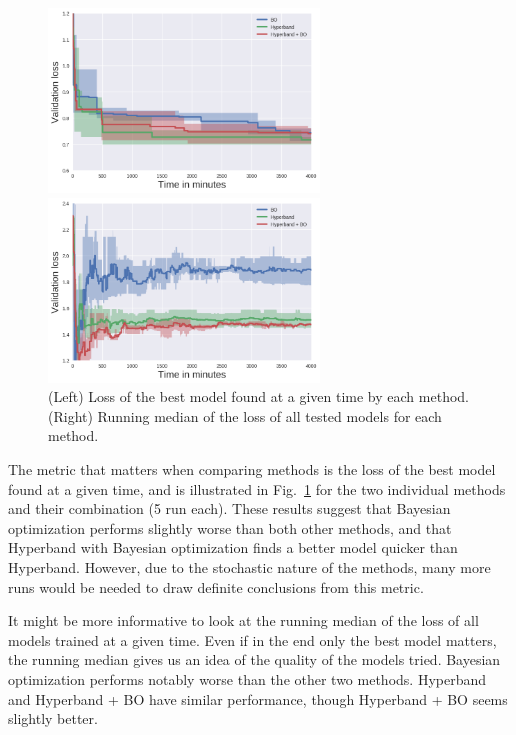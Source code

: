 \begin{figure}[htb]
	\begin{minipage}[b]{.49\linewidth}
		\centering
		\centerline{\includegraphics[width=7.2cm]{img_hyperopt/cifar_10_aggregate_best_val_loss_per_minute}}
	\end{minipage}
	\begin{minipage}[b]{.49\linewidth}
		\centering
		\centerline{\includegraphics[width=7.2cm]{img_hyperopt/cifar_10_aggregate_median_val_loss_per_minute}}
	\end{minipage}
	\caption{(Left) Loss of the best model found at a given time by each method. (Right) Running median of the loss of all tested models for each method.}
	\label{fig:combining_loss}
\end{figure}

The metric that matters when comparing methods is the loss of the best model found at a given time, and is illustrated in Fig.~\ref{fig:combining_loss} for the two individual methods and their combination (5 run each). 
These results suggest that Bayesian optimization performs slightly worse than both other methods, and that Hyperband with Bayesian optimization finds a better model quicker than Hyperband. However, due to the stochastic nature of the methods, many more runs would be needed to draw definite conclusions from this metric. 

It might be more informative to look at the running median of the loss of all models trained at a given time. Even if in the end only the best model matters, the running median gives us an idea of the quality of the models tried. Bayesian optimization performs notably worse than the other two methods. Hyperband and Hyperband + BO have similar performance, though Hyperband + BO seems slightly better.

